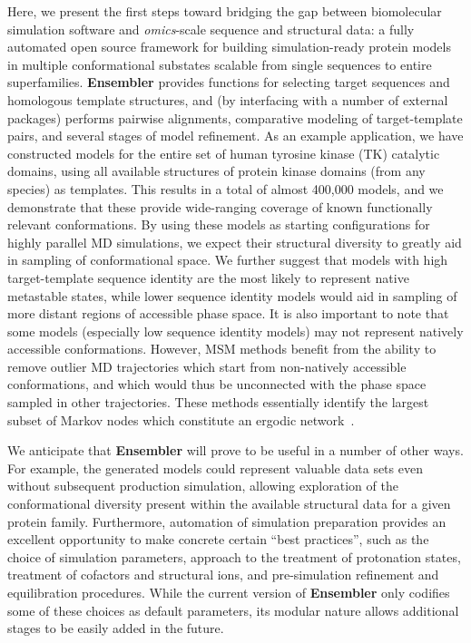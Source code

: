 \documentclass[10pt,letterpaper]{article}
\begin{document}
Here, we present the first steps toward bridging the gap between biomolecular simulation software and \emph{omics}-scale sequence and structural data: a fully automated open source framework for building simulation-ready protein models in multiple conformational substates scalable from single sequences to entire superfamilies.
{\bf Ensembler} provides functions for selecting target sequences and homologous template structures, and (by interfacing with a number of external packages) performs pairwise alignments, comparative modeling of target-template pairs, and several stages of model refinement.
As an example application, we have constructed models for the entire set of human tyrosine kinase (TK) catalytic domains, using all available structures of protein kinase domains (from any species) as templates.
This results in a total of almost 400,000 models, and we demonstrate that these provide wide-ranging coverage of known functionally relevant conformations.
By using these models as starting configurations for highly parallel MD simulations, we expect their structural diversity to greatly aid in sampling of conformational space.
We further suggest that models with high target-template sequence identity are the most likely to represent native metastable states, while lower sequence identity models would aid in sampling of more distant regions of accessible phase space.
It is also important to note that some models (especially low sequence identity models) may not represent natively accessible conformations.
However, MSM methods benefit from the ability to remove outlier MD trajectories which start from non-natively accessible conformations, and which would thus be unconnected with the phase space sampled in other trajectories.
These methods essentially identify the largest subset of Markov nodes which constitute an ergodic network~\cite{msmbuilder,caflisch:jpcb:2011:msm-subgraph}.

We anticipate that {\bf Ensembler} will prove to be useful in a number of other ways.
For example, the generated models could represent valuable data sets even without subsequent production simulation, allowing exploration of the conformational diversity present within the available structural data for a given protein family.
Furthermore, automation of simulation preparation provides an excellent opportunity to make concrete certain ``best practices'', such as the choice of simulation parameters, approach to the treatment of protonation states, treatment of cofactors and structural ions, and pre-simulation refinement and equilibration procedures.
While the current version of {\bf Ensembler} only codifies some of these choices as default parameters, its modular nature allows additional stages to be easily added in the future.
\end{document}
